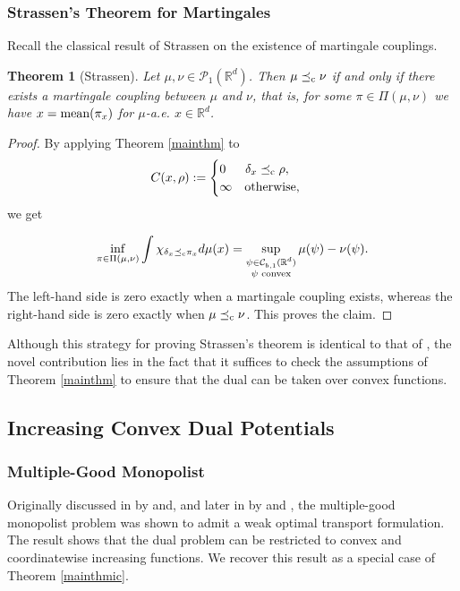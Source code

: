 \documentclass[reqno, a4paper]{amsart}
\newcommand{\lc}{\preceq_{\textnormal{c}}}
\newtheorem{theorem}{Theorem}[section]
\newcommand{\PP}{\mathcal{P}}
\newcommand{\R}{\mathbb R}
\theoremstyle{definition}
\theoremstyle{definition}
\theoremstyle{definition}
\begin{document}
\subsubsection{Strassen's Theorem for Martingales}
Recall the classical result \cite{Strassen1965} of Strassen on the existence of martingale couplings.
\begin{theorem}[Strassen] \label{strass} Let $\mu,\nu\in\PP_1(\R^d)$. Then $\mu\lc\nu$ if and only if there exists a martingale coupling between $\mu$ and $\nu$, that is, for some $\pi\in\Pi(\mu,\nu)$ we have $x=\textnormal{mean}(\pi_x)$ for $\mu$-a.e. $x\in \R^d$.
    
\end{theorem}
\begin{proof}
    By applying Theorem \ref{mainthm} to $$C(x,\rho):=\begin{cases}
        0 \quad\;\; \delta_x \lc\rho,\\
        \infty \quad \text{otherwise,}
    \end{cases}$$
we get

$$\inf_{\pi\in\Pi(\mu,\nu)} \int \chi_{\delta_x\lc\pi_x} d\mu(x)= \sup_{\substack{\psi \in {\mathcal{C}}^{}_{b,1}(\R^d) \\ \psi\text{ convex}}} \mu(\psi) - \nu(\psi).$$
    The left-hand side is zero exactly when a martingale coupling exists, whereas the right-hand side is zero exactly when $\mu\lc\nu$. This proves the claim.
\end{proof}

Although this strategy for proving Strassen's theorem is identical to that of \cite[Theorem 3.1]{GoRoSaTe14}, the novel contribution lies in the fact that it suffices to check the assumptions of Theorem \ref{mainthm} to ensure that the dual can be taken over convex functions. 

\subsection{Increasing Convex Dual Potentials}


\subsubsection{Multiple-Good Monopolist} \label{monopol}
Originally discussed in \cite{DaDeTz17} by  and, and later in
\cite{backhoffveraguas2020applicationsweaktransporttheory} by  and , the multiple-good monopolist problem was shown to admit a weak optimal transport formulation. The result \cite[Theorem 6.1]{backhoffveraguas2020applicationsweaktransporttheory} shows that the dual problem can be restricted to convex and coordinatewise increasing functions. We recover this result as a special case of Theorem \ref{mainthmic}.
\end{document}
